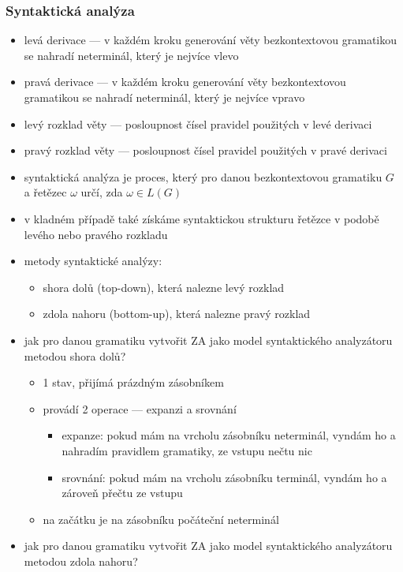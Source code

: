 \subsubsection*{Syntaktická analýza}
\begin{itemize}
	\item levá derivace --- v každém kroku generování věty bezkontextovou gramatikou se nahradí neterminál, který je nejvíce vlevo
	\item pravá derivace --- v každém kroku generování věty bezkontextovou gramatikou se nahradí neterminál, který je nejvíce vpravo
	\item levý rozklad věty --- posloupnost čísel pravidel použitých v levé derivaci
	\item pravý rozklad věty --- posloupnost čísel pravidel použitých v pravé derivaci
	\item syntaktická analýza je proces, který pro danou bezkontextovou gramatiku $G$ a řetězec $\omega$ určí, zda $\omega \in L(G)$
	\item v kladném případě také získáme syntaktickou strukturu řetězce v podobě levého nebo pravého rozkladu
	\item metody syntaktické analýzy:
		\begin{itemize}
			\item shora dolů (top-down), která nalezne levý rozklad
			\item zdola nahoru (bottom-up), která nalezne pravý rozklad
		\end{itemize}
	\item jak pro danou gramatiku vytvořit ZA jako model syntaktického analyzátoru metodou shora dolů?
	\begin{itemize}
		\item 1 stav, přijímá prázdným zásobníkem
		\item provádí 2 operace --- expanzi a srovnání
		\begin{itemize}
			\item expanze: pokud mám na vrcholu zásobníku neterminál, vyndám ho a nahradím pravidlem gramatiky, ze vstupu nečtu nic
			\item srovnání: pokud mám na vrcholu zásobníku terminál, vyndám ho a zároveň přečtu ze vstupu
		\end{itemize}
		\item na začátku je na zásobníku počáteční neterminál
	\end{itemize}
	\item jak pro danou gramatiku vytvořit ZA jako model syntaktického analyzátoru metodou zdola nahoru?

\end{itemize}
